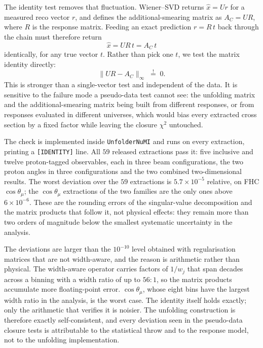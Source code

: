 \documentclass[11pt,a4paper]{article}
\begin{document}
The identity test removes that fluctuation. Wiener--SVD returns
$\hat{x} = U r$ for a measured reco vector $r$, and defines the additional-smearing matrix
as $A_C = U R$, where $R$ is the response matrix. Feeding an exact
prediction $r = R\,t$ back through the chain must therefore return
\begin{equation}
  \hat{x} = U R\, t = A_C\, t
\end{equation}
identically, for any true vector $t$. Rather than pick one $t$, we test the matrix
identity directly:
\begin{equation}
  \bigl\| U R - A_C \bigr\|_\infty \;\overset{!}{=}\; 0 .
\end{equation}
This is stronger than a single-vector test and independent of the data. It is sensitive to
the failure mode a pseudo-data test cannot see: the unfolding matrix and the additional-smearing
matrix
being built from different responses, or from responses evaluated in different universes,
which would bias every extracted cross section by a fixed factor while leaving the closure
$\chi^2$ untouched.

The check is implemented inside \texttt{UnfolderNuMI} and runs on every extraction, printing
a \texttt{[IDENTITY]} line. All $59$ released extractions pass it: five inclusive and twelve
proton-tagged observables, each in three beam configurations, the two proton angles in three
configurations and the two combined two-dimensional results. The worst deviation over the $59$
extractions is
$5.7\times10^{-5}$ relative, on FHC $\cos\theta_\mu$; the $\cos\theta_\mu$ extractions of the two
families are the only ones above $6\times10^{-6}$. These are the
rounding errors of the singular-value decomposition and the matrix products that follow it,
not physical effects: they remain more than two orders of magnitude below the smallest systematic
uncertainty in the analysis.

The deviations are larger than the $10^{-10}$ level obtained with regularisation matrices that
are not width-aware, and the reason is arithmetic rather than physical. The width-aware
operator carries factors of $1/w_j$ that span decades across a binning with a width ratio of up
to $56{:}1$, so the matrix products accumulate more floating-point error. $\cos\theta_\mu$, whose
eight bins have the largest width ratio in the analysis, is the worst case. The identity itself
holds exactly; only the arithmetic that verifies it is noisier. The unfolding construction is therefore exactly self-consistent,
and every deviation seen in the pseudo-data closure tests is attributable to the statistical
throw and to the response model, not to the unfolding implementation.
\end{document}
